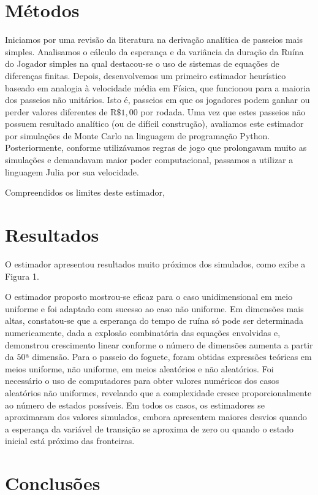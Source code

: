 \documentclass[a4paper,10pt,twocolumn]{article}
\begin{document}
\section{Métodos}

Iniciamos por uma revisão da literatura na derivação analítica de passeios mais
simples. Analisamos o cálculo da esperança e da variância da duração da Ruína do
Jogador simples \cite{andel_variance_2012} na qual destacou-se o uso de sistemas
de equações de diferenças finitas. Depois, desenvolvemos um primeiro estimador
heurístico baseado em analogia à velocidade média em Física, que funcionou para
a maioria dos passeios não unitários. Isto é, passeios em que os jogadores podem
ganhar ou perder valores diferentes de $\mathrm{R}\$1,00$ por rodada. Uma vez que estes
passeios não possuem resultado analítico (ou de difícil construção), avaliamos este
estimador por simulações de Monte Carlo na linguagem de programação Python.
Posteriormente, conforme utilizávamos regras de jogo que prolongavam muito as
simulações e demandavam maior poder computacional, passamos a utilizar a
linguagem Julia por sua velocidade.

Compreendidos os limites deste estimador,

\section{Resultados}

O estimador apresentou resultados muito
próximos dos simulados, como exibe a Figura 1.

O estimador proposto mostrou-se eficaz para o caso unidimensional em meio
uniforme e foi adaptado com sucesso ao caso não uniforme. Em dimensões mais
altas, constatou-se que a esperança do tempo de ruína só pode ser determinada
numericamente, dada a explosão combinatória das equações envolvidas e,
demonstrou crescimento linear conforme o número de dimensões aumenta a partir da
$50$ª dimensão. Para o passeio do foguete, foram obtidas expressões teóricas em
meios uniforme, não uniforme, em meios aleatórios e não aleatórios. Foi
necessário o uso de computadores para obter valores numéricos dos casos
aleatórios não uniformes, revelando que a complexidade cresce proporcionalmente
ao número de estados possíveis. Em todos os casos, os estimadores se aproximaram
dos valores simulados, embora apresentem maiores desvios quando a esperança da
variável de transição se aproxima de zero ou quando o estado inicial está
próximo das fronteiras.

\section{Conclusões}
\end{document}
